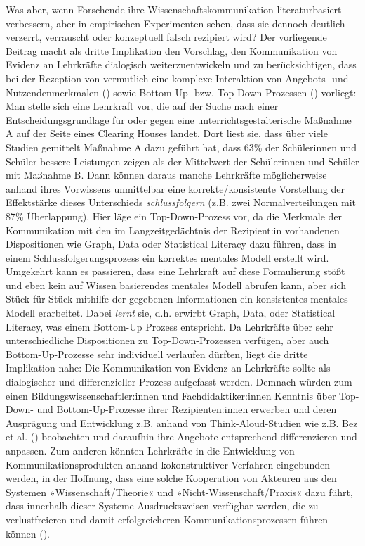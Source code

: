 \documentclass[
  jou,
  floatsintext,
  longtable,
  nolmodern,
  notxfonts,
  notimes,
  colorlinks=true,linkcolor=blue,citecolor=blue,urlcolor=blue]{apa7}
\begin{document}
Was aber, wenn Forschende ihre Wissenschaftskommunikation
literaturbasiert verbessern, aber in empirischen Experimenten sehen,
dass sie dennoch deutlich verzerrt, verrauscht oder konzeptuell falsch
rezipiert wird? Der vorliegende Beitrag macht als dritte Implikation den
Vorschlag, den Kommunikation von Evidenz an Lehrkräfte dialogisch
weiterzuentwickeln und zu berücksichtigen, dass bei der Rezeption von
vermutlich eine komplexe Interaktion von Angebots- und
Nutzendenmerkmalen () sowie Bottom-Up- bzw. Top-Down-Prozessen
() vorliegt: Man stelle sich
eine Lehrkraft vor, die auf der Suche nach einer Entscheidungsgrundlage
für oder gegen eine unterrichtsgestalterische Maßnahme A auf der Seite
eines Clearing Houses landet. Dort liest sie, dass über viele Studien
gemittelt Maßnahme A dazu geführt hat, dass 63\% der Schülerinnen und
Schüler bessere Leistungen zeigen als der Mittelwert der Schülerinnen
und Schüler mit Maßnahme B. Dann können daraus manche Lehrkräfte
möglicherweise anhand ihres Vorwissens unmittelbar eine
korrekte/konsistente Vorstellung der Effektstärke dieses Unterschieds
\emph{schlussfolgern} (z.B. zwei Normalverteilungen mit 87\%
Überlappung). Hier läge ein Top-Down-Prozess vor, da die Merkmale der
Kommunikation mit den im Langzeitgedächtnis der Rezipient:in vorhandenen
Dispositionen wie Graph, Data oder Statistical Literacy dazu führen,
dass in einem Schlussfolgerungsprozess ein korrektes mentales Modell
erstellt wird. Umgekehrt kann es passieren, dass eine Lehrkraft auf
diese Formulierung stößt und eben kein auf Wissen basierendes mentales
Modell abrufen kann, aber sich Stück für Stück mithilfe der gegebenen
Informationen ein konsistentes mentales Modell erarbeitet. Dabei
\emph{lernt} sie, d.h. erwirbt Graph, Data, oder Statistical Literacy,
was einem Bottom-Up Prozess entspricht. Da Lehrkräfte über sehr
unterschiedliche Dispositionen zu Top-Down-Prozessen verfügen, aber auch
Bottom-Up-Prozesse sehr individuell verlaufen dürften, liegt die dritte
Implikation nahe: Die Kommunikation von Evidenz an Lehrkräfte sollte als
dialogischer und differenzieller Prozess aufgefasst werden. Demnach
würden zum einen Bildungswissenschaftler:innen und Fachdidaktiker:innen
Kenntnis über Top-Down- und Bottom-Up-Prozesse ihrer Rezipienten:innen
erwerben und deren Ausprägung und Entwicklung z.B. anhand von
Think-Aloud-Studien wie z.B. Bez et al. ()
beobachten und daraufhin ihre Angebote entsprechend differenzieren und
anpassen. Zum anderen könnten Lehrkräfte in die Entwicklung von
Kommunikationsprodukten anhand kokonstruktiver Verfahren eingebunden
werden, in der Hoffnung, dass eine solche Kooperation von Akteuren aus
den Systemen »Wissenschaft/Theorie« und »Nicht-Wissenschaft/Praxis« dazu
führt, dass innerhalb dieser Systeme Ausdrucksweisen verfügbar werden,
die zu verlustfreieren und damit erfolgreicheren Kommunikationsprozessen
führen können ().
\end{document}
